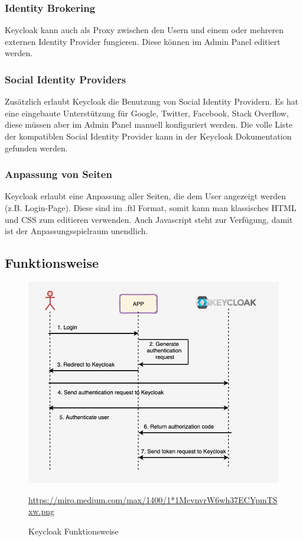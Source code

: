 \subsubsection{Identity Brokering}
Keycloak kann auch als Proxy zwischen den Usern und einem oder mehreren externen Identity Provider fungieren. Diese können im Admin Panel editiert werden. \cite{KeyCloakDZone}
\subsubsection{Social Identity Providers}
Zusätzlich erlaubt Keycloak die Benutzung von Social Identity Providern. Es hat eine eingebaute Unterstützung für Google, Twitter, Facebook, Stack Overflow, diese müssen aber 
im Admin Panel manuell konfiguriert werden. Die volle Liste der kompatiblen Social Identity Provider kann in der Keycloak Dokumentation gefunden werden. \cite{KeyCloakDZone}
\subsubsection{Anpassung von Seiten}
Keycloak erlaubt eine Anpassung aller Seiten, die dem User angezeigt werden (z.B. Login-Page). Diese sind im .ftl Format, somit kann man klassisches HTML und CSS zum editieren verwenden.
Auch Javascript steht zur Verfügung, damit ist der Anpassungsspielraum unendlich. \cite{KeyCloakDZone}
\pagebreak

\subsection{Funktionsweise}
\begin{figure}[htp]
    \centering
    \includegraphics[scale=0.55]{pics/Keycloak-Funktionsweise2.png}
    \caption{Keycloak Funktionsweise}
    \small \url{https://miro.medium.com/max/1400/1*1McvnvrW6wh37ECYpmTSxw.png}
    \label{fig:impl:KeycloakFunc}
\end{figure}

